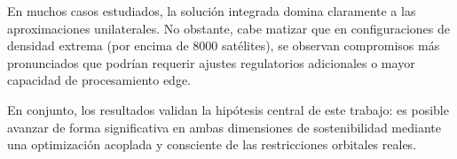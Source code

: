 En muchos casos estudiados, la solución integrada domina claramente a las aproximaciones unilaterales. No obstante, cabe matizar que en configuraciones de densidad extrema (por encima de 8000 satélites), se observan compromisos más pronunciados que podrían requerir ajustes regulatorios adicionales o mayor capacidad de procesamiento edge.

En conjunto, los resultados validan la hipótesis central de este trabajo: es posible avanzar de forma significativa en ambas dimensiones de sostenibilidad mediante una optimización acoplada y consciente de las restricciones orbitales reales.